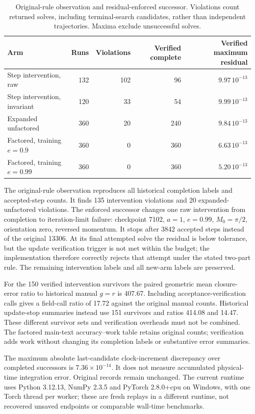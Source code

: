\documentclass[11pt]{article}
\begin{document}
\begin{table}[ht]
\centering\small
\caption{Original-rule observation and residual-enforced successor. Violations
count returned solves, including terminal-search candidates, rather than
independent trajectories. Maxima exclude unsuccessful solves.}
\begin{tabular}{lrrrr}
\toprule
Arm & Runs & Violations & Verified complete & Verified maximum residual \\
\midrule
Step intervention, raw & 132 & 102 & 96 & $9.97\,10^{-13}$ \\
Step intervention, invariant & 120 & 33 & 54 & $9.99\,10^{-13}$ \\
Expanded unfactored & 360 & 20 & 240 & $9.84\,10^{-13}$ \\
Factored, training $e=0.9$ & 360 & 0 & 360 & $6.63\,10^{-13}$ \\
Factored, training $e=0.99$ & 360 & 0 & 360 & $5.20\,10^{-13}$ \\
\bottomrule
\end{tabular}
\end{table}

The original-rule observation reproduces all historical completion labels
and accepted-step counts. It finds 135 intervention violations and 20
expanded-unfactored violations. The enforced successor changes one raw
intervention from completion to iteration-limit failure: checkpoint 7102,
$a=1$, $e=0.99$, $M_0=\pi/2$, orientation zero, reversed momentum.
It stops after 3842 accepted steps instead of the original 13306. At its
final attempted solve the residual is below tolerance, but the update
verification trigger is not met within the budget; the implementation
therefore correctly rejects that attempt under the stated two-part rule.
The remaining intervention labels and all new-arm labels are preserved.

For the 150 verified intervention survivors the paired geometric mean
closure-error ratio to historical manual $g=r$ is 407.67. Including
acceptance-verification calls gives a field-call ratio of 17.72 against
the original manual counts. Historical update-stop summaries instead use
151 survivors and ratios 414.08 and 14.47. These different survivor sets
and verification overheads must not be combined. The factored main-text
accuracy--work table retains original counts; verification adds work
without changing its completion labels or substantive error summaries.

The maximum absolute last-candidate clock-increment discrepancy over
completed successors is $7.36\times10^{-14}$. It does not measure
accumulated physical-time integration error. Original records remain
unchanged. The current runtime uses Python 3.12.13, NumPy 2.3.5 and
PyTorch 2.8.0+cpu on Windows, with one Torch thread per worker; these are
fresh replays in a different runtime, not recovered unsaved endpoints or
comparable wall-time benchmarks.
\end{document}
